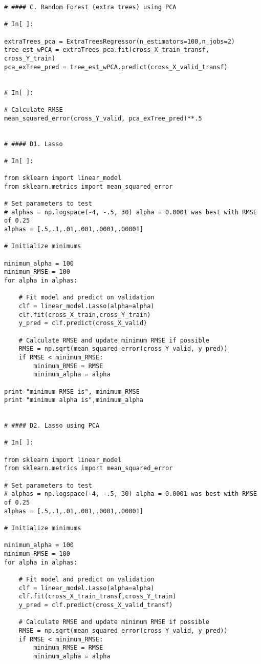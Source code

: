 \documentclass[11pt, oneside]{article}   	%
\begin{document}
\begin{lstlisting}
# #### C. Random Forest (extra trees) using PCA

# In[ ]:

extraTrees_pca = ExtraTreesRegressor(n_estimators=100,n_jobs=2)
tree_est_wPCA = extraTrees_pca.fit(cross_X_train_transf, cross_Y_train)
pca_exTree_pred = tree_est_wPCA.predict(cross_X_valid_transf)


# In[ ]:

# Calculate RMSE
mean_squared_error(cross_Y_valid, pca_exTree_pred)**.5


# #### D1. Lasso

# In[ ]:

from sklearn import linear_model
from sklearn.metrics import mean_squared_error

# Set parameters to test
# alphas = np.logspace(-4, -.5, 30) alpha = 0.0001 was best with RMSE of 0.25
alphas = [.5,.1,.01,.001,.0001,.00001]

# Initialize minimums 

minimum_alpha = 100
minimum_RMSE = 100
for alpha in alphas:
    
    # Fit model and predict on validation
    clf = linear_model.Lasso(alpha=alpha)
    clf.fit(cross_X_train,cross_Y_train)
    y_pred = clf.predict(cross_X_valid) 
    
    # Calculate RMSE and update minimum RMSE if possible
    RMSE = np.sqrt(mean_squared_error(cross_Y_valid, y_pred))
    if RMSE < minimum_RMSE:
        minimum_RMSE = RMSE
        minimum_alpha = alpha
    
print "minimum RMSE is", minimum_RMSE
print "minimum alpha is",minimum_alpha


# #### D2. Lasso using PCA

# In[ ]:

from sklearn import linear_model
from sklearn.metrics import mean_squared_error

# Set parameters to test
# alphas = np.logspace(-4, -.5, 30) alpha = 0.0001 was best with RMSE of 0.25
alphas = [.5,.1,.01,.001,.0001,.00001]

# Initialize minimums 

minimum_alpha = 100
minimum_RMSE = 100
for alpha in alphas:
    
    # Fit model and predict on validation
    clf = linear_model.Lasso(alpha=alpha)
    clf.fit(cross_X_train_transf,cross_Y_train)
    y_pred = clf.predict(cross_X_valid_transf) 
    
    # Calculate RMSE and update minimum RMSE if possible
    RMSE = np.sqrt(mean_squared_error(cross_Y_valid, y_pred))
    if RMSE < minimum_RMSE:
        minimum_RMSE = RMSE
        minimum_alpha = alpha
    

\end{lstlisting}
\end{document}
